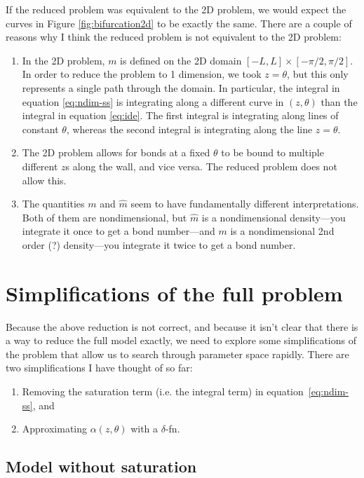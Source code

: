 \documentclass{article}
\begin{document}
If the reduced problem was equivalent to the 2D problem, we would
expect the curves in Figure \ref{fig:bifurcation2d} to be exactly the
same. There are a couple of reasons why I think the reduced problem is
not equivalent to the 2D problem:
\begin{enumerate}
\item In the 2D problem, $m$ is defined on the 2D domain $[-L, L]
  \times [-\pi/2, \pi/2]$. In order to reduce the problem to 1
  dimension, we took $z = \theta$, but this only represents a single
  path through the domain. In particular, the integral in equation
  \eqref{eq:ndim-ss} is integrating along a different curve in $(z,
  \theta)$ than the integral in equation \eqref{eq:ide}. The first
  integral is integrating along lines of constant $\theta$, whereas
  the second integral is integrating along the line $z = \theta$.
\item The 2D problem allows for bonds at a fixed $\theta$ to be bound
  to multiple different $z$s along the wall, and vice versa. The
  reduced problem does not allow this.
\item The quantities $m$ and $\hat{m}$ seem to have fundamentally
  different interpretations. Both of them are nondimensional, but
  $\hat{m}$ is a nondimensional density---you integrate it once to get
  a bond number---and $m$ is a nondimensional 2nd order (?)
  density---you integrate it twice to get a bond number.
\end{enumerate}

\section{Simplifications of the full problem}
\label{sec:simpl-full-probl}

Because the above reduction is not correct, and because it isn't clear
that there is a way to reduce the full model exactly, we need to
explore some simplifications of the problem that allow us to
search through parameter space rapidly. There are two simplifications
I have thought of so far:
\begin{enumerate}
\item Removing the saturation term (i.e. the integral term) in
  equation~\eqref{eq:ndim-ss}, and 
\item Approximating $\alpha(z, \theta)$ with a $\delta$-fn.
\end{enumerate}

\subsection{Model without saturation}
\label{sec:model-no-satur}
\end{document}
